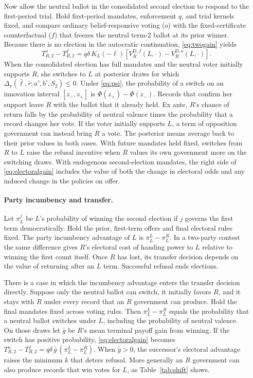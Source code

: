 \documentclass[11pt,letterpaper]{article}
\newcommand{\D}{\mathrm D}
\begin{document}
Now allow the neutral ballot in the consolidated second election to respond to the first-period trial. Hold first-period mandates, enforcement $q$, and trial kernels fixed, and compare ordinary belief-responsive voting ($o$) with the fixed-certificate counterfactual ($f$) that freezes the neutral term-$2$ ballot at its prior winner. Because there is no election in the autocratic continuation, \eqref{eq:twogain} yields
\begin{equation}
 T_{R,2}^{o}-T_{R,2}^{f}
 =q\delta\,K_L(-\ell)\!\left[V_R^{\D,f}(L,\cdot)-V_R^{\D,o}(L,\cdot)\right].
 \label{eq:electoralgain}
\end{equation}
When the consolidated election has full mandates and the neutral voter initially supports $R$, she switches to $L$ at posterior draws for which $\Delta_v(\bar\ell,\bar r;a',b',S_2)\le 0$. Under \eqref{eq:psi}, the probability of a switch on an innovation interval $[z_-,z_+]$ is $\Phi(z_+)-\Phi(z_-)$. Records that confirm her support leave $R$ with the ballot that it already held. Ex ante, $R$'s chance of return falls by the probability of neutral valence times the probability that a record changes her vote. If the voter initially supports $L$, a term of opposition government can instead bring $R$ a vote. The posterior means average back to their prior values in both cases. With future mandates held fixed, switches from $R$ to $L$ raise the refusal incentive when $R$ values its own government more on the switching draws. With endogenous second-election mandates, the right side of \eqref{eq:electoralgain} includes the value of both the change in electoral odds and any induced change in the policies on offer.

\paragraph{Party incumbency and transfer.}
Let $\pi_L^j$ be $L$'s probability of winning the second election if $j$ governs the first term democratically. Hold the prior, first-term offers and final electoral rules fixed. The party incumbency advantage of $L$ is $\pi_L^L-\pi_L^R$. In a two-party contest the same difference gives $R$'s electoral cost of handing power to $L$ relative to winning the first count itself. Once $R$ has lost, its transfer decision depends on the value of returning after an $L$ term. Successful refusal ends elections.

There is a case in which the incumbency advantage enters the transfer decision directly. Suppose only the neutral ballot can switch, it initially favors $R$, and it stays with $R$ under every record that an $R$ government can produce. Hold the final mandates fixed across voting rules. Then $\pi_L^L-\pi_L^R$ equals the probability that a neutral ballot switches under $L$, including the probability of neutral valence. On those draws let $\bar g$ be $R$'s mean terminal payoff gain from winning. If the switch has positive probability, \eqref{eq:electoralgain} becomes $T_{R,2}^o-T_{R,2}^f=q\delta\,\bar g\,(\pi_L^L-\pi_L^R)$. When $\bar g>0$, the successor's electoral advantage raises the minimum $k$ that deters refusal. More generally an $R$ government can also produce records that win votes for $L$, as Table~\ref{tab:shift} shows.
\end{document}
